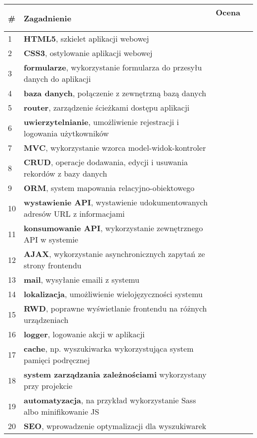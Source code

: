 \documentclass{article}
\begin{document}
	\begin{tabularx}{.95\textwidth}{l|X|l}
		\textbf{\#} & \textbf{Zagadnienie} & \textbf{ Ocena \ \ \ } \\ \hline
		1 & \textbf{HTML5}, szkielet aplikacji webowej \\ \hline
		2 & \textbf{CSS3}, ostylowanie aplikacji webowej \\ \hline
		3 & \textbf{formularze}, wykorzystanie formularza do przesyłu danych do aplikacji \\ \hline
		4 & \textbf{baza danych}, połączenie z zewnętrzną bazą danych \\ \hline
		5 & \textbf{router}, zarządzenie ścieżkami dostępu aplikacji \\ \hline
		6 & \textbf{uwierzytelnianie}, umożliwienie rejestracji i logowania użytkowników \\ \hline
		7 & \textbf{MVC}, wykorzystanie wzorca model-widok-kontroler \\ \hline
		8 & \textbf{CRUD}, operacje dodawania, edycji i usuwania rekordów z bazy danych \\ \hline
		9 & \textbf{ORM}, system mapowania relacyjno-obiektowego \\ \hline
		10 & \textbf{wystawienie API}, wystawienie udokumentowanych adresów URL z informacjami \\ \hline
		11 & \textbf{konsumowanie API}, wykorzystanie zewnętrznego API w systemie \\ \hline
		12 & \textbf{AJAX}, wykorzystanie asynchronicznych zapytań ze strony frontendu\\ \hline
		13 & \textbf{mail}, wysyłanie emaili z systemu \\ \hline
		14 & \textbf{lokalizacja}, umożliwienie wielojęzyczności systemu \\ \hline
		15 & \textbf{RWD}, poprawne wyświetlanie frontendu na różnych urządzeniach \\ \hline
		16 & \textbf{logger}, logowanie akcji w aplikacji \\ \hline
		17 & \textbf{cache}, np. wyszukiwarka wykorzystująca system pamięci podręcznej \\ \hline
		18 & \textbf{system zarządzania zależnościami} wykorzystany przy projekcie\\ \hline
		19 & \textbf{automatyzacja}, na przykład wykorzystanie Sass albo minifikowanie JS \\ \hline
		20 & \textbf{SEO}, wprowadzenie optymalizacji dla wyszukiwarek \\
	\end{tabularx}
	
\end{document}

